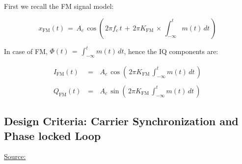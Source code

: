  
 First we recall the FM signal model:
 
 \begin{equation}
    x_{\text{FM}}(t) \, = \, A_c \, \cos{ \left( \,  2 \pi f_c \, t \, + \, 2 \pi K_{\text{FM}} \, \times \, \displaystyle\int_{- \infty}^t  m(t)\, dt  \,\right)}
\label{Eq:FM:equation_tx}
\end{equation}

In case of FM, $\Phi(t) \, = \, \displaystyle\int_{- \infty}^t  m(t)\, dt$, hence the IQ components are:

\begin{eqnarray}
 I_{\text{FM}}(t) \, &=& \,  A_c \, \cos{ \left(  \, 2 \pi K_{\text{FM}}  \, \displaystyle\int_{- \infty}^t  m(t)\, dt  \,\right)} \\ \\
  Q_{\text{FM}}(t) \, &=& \,  A_c \, \sin{ \left(  \, 2 \pi K_{\text{FM}}  \, \displaystyle\int_{- \infty}^t  m(t)\, dt  \,\right)}
\end{eqnarray}
 
 
 \newpage
\subsection{Design Criteria: Carrier Synchronization and Phase locked Loop}

\underline{Source:} 

